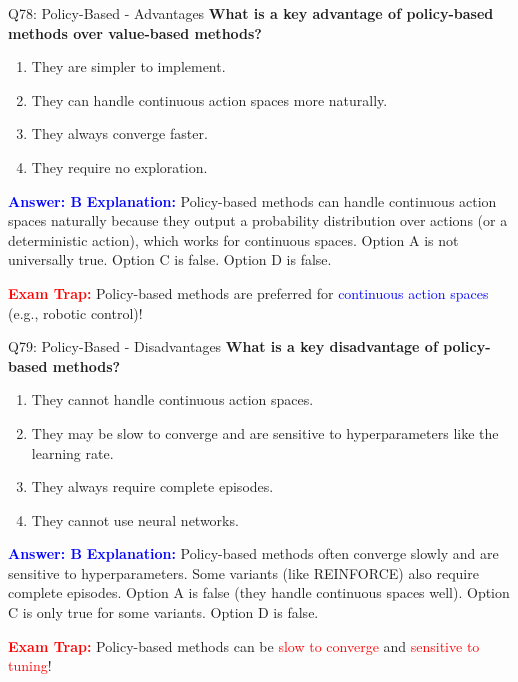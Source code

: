 \documentclass[8pt]{beamer}
\begin{document}
	\begin{frame}{Q78: Policy-Based - Advantages}
		\fontsize{6.5}{7.5}\selectfont
		\textbf{What is a key advantage of policy-based methods over value-based methods?}
		
		\begin{enumerate}
			\item They are simpler to implement.
			\item They can handle continuous action spaces more naturally.
			\item They always converge faster.
			\item They require no exploration.
		\end{enumerate}
		
		\vspace{0.1cm}
		\textcolor{blue}{\textbf{Answer: B}}
		\vspace{0.1cm}
		\textcolor{blue}{\textbf{Explanation:}} Policy-based methods can handle continuous action spaces naturally because they output a probability distribution over actions (or a deterministic action), which works for continuous spaces. Option A is not universally true. Option C is false. Option D is false.
		
		\textcolor{red}{\textbf{Exam Trap:}} Policy-based methods are preferred for \textcolor{blue}{continuous action spaces} (e.g., robotic control)!
	\end{frame}
	
	\begin{frame}{Q79: Policy-Based - Disadvantages}
		\fontsize{6.5}{7.5}\selectfont
		\textbf{What is a key disadvantage of policy-based methods?}
		
		\begin{enumerate}
			\item They cannot handle continuous action spaces.
			\item They may be slow to converge and are sensitive to hyperparameters like the learning rate.
			\item They always require complete episodes.
			\item They cannot use neural networks.
		\end{enumerate}
		
		\vspace{0.1cm}
		\textcolor{blue}{\textbf{Answer: B}}
		\vspace{0.1cm}
		\textcolor{blue}{\textbf{Explanation:}} Policy-based methods often converge slowly and are sensitive to hyperparameters. Some variants (like REINFORCE) also require complete episodes. Option A is false (they handle continuous spaces well). Option C is only true for some variants. Option D is false.
		
		\textcolor{red}{\textbf{Exam Trap:}} Policy-based methods can be \textcolor{red}{slow to converge} and \textcolor{red}{sensitive to tuning}!
	\end{frame}
	
\end{document}
